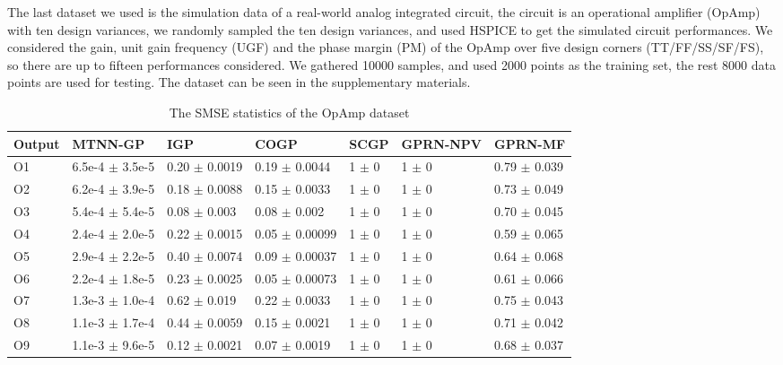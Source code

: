 The last dataset we used is the simulation data of a real-world analog integrated circuit, the circuit is an operational amplifier (OpAmp) with ten design variances, we randomly sampled the ten design variances, and used HSPICE to get the simulated circuit performances. We considered the gain, unit gain frequency (UGF) and the phase margin (PM) of the OpAmp over five design corners (TT/FF/SS/SF/FS), so there are up to fifteen performances considered. We gathered 10000 samples, and used 2000 points as the training set, the rest 8000 data points are used for testing. The dataset can be seen in the supplementary materials.

\begin{table}[!htb]
    \centering
    \caption{The SMSE statistics of the OpAmp dataset}
    \label{tab:smse_DAC}
    \begin{tabular}{lllllll}
        \toprule
        Output & MTNN-GP               &  IGP                  & COGP                  & SCGP          &  GPRN-NPV    & GPRN-MF            \\ \midrule
        O1     &  6.5e-4 $\pm$  3.5e-5 &  0.20 $\pm$  0.0019   &  0.19 $\pm$  0.0044   &  1  $\pm$  0  &  1  $\pm$  0 &  0.79 $\pm$  0.039 \\
        O2     &  6.2e-4 $\pm$  3.9e-5 &  0.18 $\pm$  0.0088   &  0.15 $\pm$  0.0033   &  1  $\pm$  0  &  1  $\pm$  0 &  0.73 $\pm$  0.049 \\
        O3     &  5.4e-4 $\pm$  5.4e-5 &  0.08 $\pm$  0.003    &  0.08 $\pm$  0.002    &  1  $\pm$  0  &  1  $\pm$  0 &  0.70 $\pm$  0.045 \\
        O4     &  2.4e-4 $\pm$  2.0e-5 &  0.22 $\pm$  0.0015   &  0.05 $\pm$  0.00099  &  1  $\pm$  0  &  1  $\pm$  0 &  0.59 $\pm$  0.065 \\
        O5     &  2.9e-4 $\pm$  2.2e-5 &  0.40 $\pm$  0.0074   &  0.09 $\pm$  0.00037  &  1  $\pm$  0  &  1  $\pm$  0 &  0.64 $\pm$  0.068 \\
        O6     &  2.2e-4 $\pm$  1.8e-5 &  0.23 $\pm$  0.0025   &  0.05 $\pm$  0.00073  &  1  $\pm$  0  &  1  $\pm$  0 &  0.61 $\pm$  0.066 \\
        O7     &  1.3e-3 $\pm$  1.0e-4 &  0.62 $\pm$  0.019    &  0.22 $\pm$  0.0033   &  1  $\pm$  0  &  1  $\pm$  0 &  0.75 $\pm$  0.043 \\
        O8     &  1.1e-3 $\pm$  1.7e-4 &  0.44 $\pm$  0.0059   &  0.15 $\pm$  0.0021   &  1  $\pm$  0  &  1  $\pm$  0 &  0.71 $\pm$  0.042 \\
        O9     &  1.1e-3 $\pm$  9.6e-5 &  0.12 $\pm$  0.0021   &  0.07 $\pm$  0.0019   &  1  $\pm$  0  &  1  $\pm$  0 &  0.68 $\pm$  0.037 \\

\end{tabular}
\end{table}
